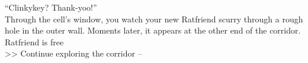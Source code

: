 “Clinkykey? Thank-yoo!”\\

Through the cell’s window, you watch your new Ratfriend scurry through a rough hole in the outer wall. Moments later, it appears at the other end of the corridor.\\

 Ratfriend is free\\
>> Continue exploring the corridor -- 